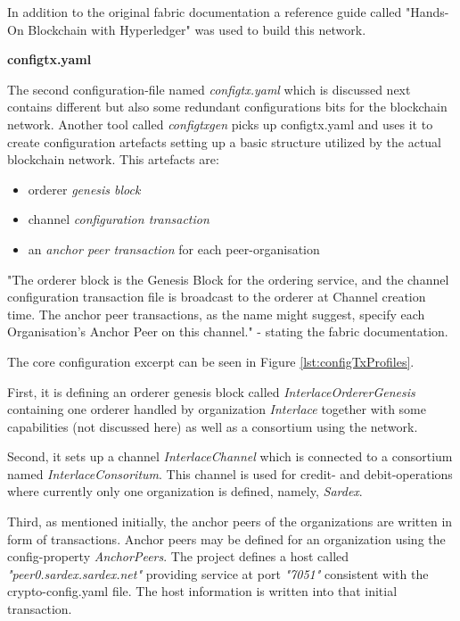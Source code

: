 In addition to the original fabric documentation a reference guide called "Hands-On Blockchain with Hyperledger" \cite{HandsOnBlockchainHyperledger2018} was used to build this network.

\textbf{configtx.yaml}

The second configuration-file named \textit{configtx.yaml} which is discussed next contains different but also some redundant configurations bits for the blockchain network. Another tool called \textit{configtxgen} picks up configtx.yaml and uses it to create configuration artefacts setting up a basic structure utilized by the actual blockchain network. This artefacts are:

\begin{itemize}
	\item orderer \textit{genesis block}
	\item channel \textit{configuration transaction}
	\item an \textit{anchor peer transaction} for each peer-organisation
\end{itemize}

"The orderer block is the Genesis Block for the ordering service, and the channel configuration transaction file is
broadcast to the orderer at Channel creation time. The anchor peer transactions, as the name might suggest, specify
each Organisation's Anchor Peer on this channel." - stating the fabric documentation.

The core configuration excerpt can be seen in Figure \ref{lst:configTxProfiles}.

First, it is defining an orderer genesis block called \textit{InterlaceOrdererGenesis} containing one orderer handled by organization \textit{Interlace} together with some capabilities (not discussed here) as well as a consortium using the network.

Second, it sets up a channel \textit{InterlaceChannel} which is connected to a consortium named \textit{InterlaceConsoritum}. This channel is used for credit- and debit-operations where currently only one organization is defined, namely, \textit{Sardex}.

Third, as mentioned initially, the anchor peers of the organizations are written in form of transactions. Anchor peers may be defined for an organization using the config-property \textit{AnchorPeers}. The project defines a host called \textit{"peer0.sardex.sardex.net"} providing service at port \textit{"7051"} consistent with the crypto-config.yaml file. The host information is written into that initial transaction.

